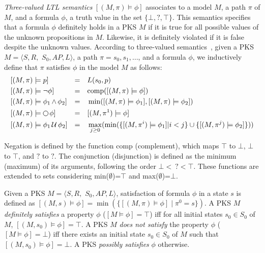 \emph{Three-valued LTL semantics} $[(M,\pi) \models \phi]$ associates to a model $M$, a path $\pi$ of  $M$, and a formula $\phi$, a truth value in the set $\{ \bot, ?, \top \}$. This semantics specifies that a formula $\phi$ definitely holds in a PKS $M$ if it is true for all possible values of the unknown propositions in $M$. 
Likewise, it is definitely violated if it is false despite the unknown values.
According to three-valued semantics~\cite{godefroid2011ltl}, given a PKS $M = \langle S, R,$ $S_0, AP, L \rangle$, a path $\pi=s_0,s_1,\ldots$, and a formula $\phi$, we inductively define that $\pi$ satisfies $\phi$ in the model $M$ as follows:
\begin{align*}
&[(M,\pi) \models p] &   = &&& L(s_0,p)\\
&[(M,\pi) \models \lnot\phi] &   = &&& \textnormal{comp}([(M,\pi) \models\phi]) \\
&[(M,\pi) \models \phi_1 \LTLand \phi_2] &   =   &&& \min([(M,\pi) \models\phi_1],[(M,\pi) \models\phi_2])\\
&[(M,\pi) \models \LTLnext \phi] &   =  &&& [(M,\pi^1) \models\phi]\\
&[(M,\pi) \models \phi_1 \LTLuntil \phi_2] &   =  &&& \max_{j\geq 0}(\min(\{[(M,\pi^i) \models\phi_1]|i<j\} \cup \{[(M,\pi^j) \models\phi_2]\}))
\end{align*}

Negation is defined by the function comp (complement), which maps $\top$ to $\bot$, $\bot$ to $\top$, and $?$ to $?$.
The conjunction (disjunction) is defined as the minimum (maximum) of its arguments, following the order $\bot <\ ? < \top$. These functions are extended to sets considering min($\emptyset$)=$\top$ and max($\emptyset$)=$\bot$.

Given a PKS $M = \langle S, R,$ $S_0, AP, L \rangle$, satisfaction of formula $\phi$ in a state $s$ is defined as  $[(M, s) \models \phi]  =   \min(\{[(M, \pi) \models \phi] \mid \pi^0=s\})$.
A PKS $M$ \emph{definitely satisfies} a property $\phi$ ($[M \models \phi]=\top$) iff for all initial states $s_0 \in S_0$ of $M$, $[(M, s_0) \models \phi]=\top$. 
A PKS $M$ \emph{does not satisfy} the property $\phi$ ($[M \models \phi]=\bot$) iff there exists an initial state $s_0 \in S_0$ of $M$ such that  $[(M, s_0) \models \phi]=\bot$.
A PKS \emph{possibly satisfies} $\phi$ otherwise.



